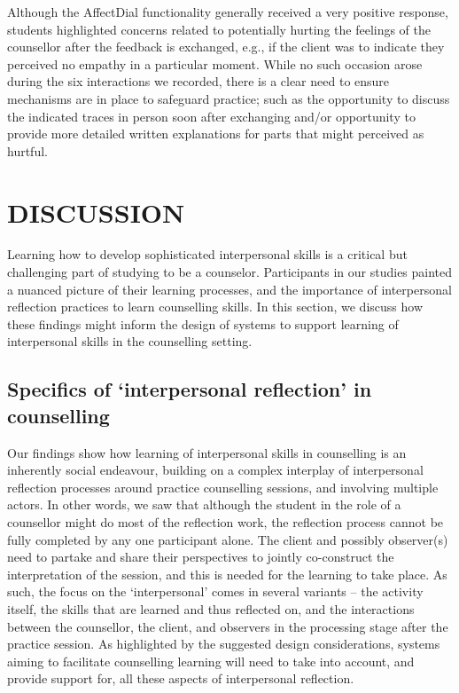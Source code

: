 \documentclass{sigchi}
\begin{document}
Although the AffectDial functionality generally received a very positive response, students highlighted concerns related to potentially hurting the feelings of the counsellor after the feedback is exchanged, e.g., if the client was to indicate they perceived no empathy in a particular moment. While no such occasion arose during the six interactions we recorded, there is a clear need to ensure mechanisms are in place to safeguard practice; such as the opportunity to discuss the indicated traces in person soon after exchanging and/or opportunity to provide more detailed written explanations for parts that might perceived as hurtful. 



\section{DISCUSSION}
Learning how to develop sophisticated interpersonal skills is a critical but challenging part of studying to be a counselor. Participants in our studies painted a nuanced picture of their learning processes, and the importance of interpersonal reflection practices to learn counselling skills. In this section, we discuss how these findings might inform the design of systems to support learning of interpersonal skills in the counselling setting. 


\subsection{Specifics of `interpersonal reflection' in counselling}
Our findings show how learning of interpersonal skills in counselling is an inherently social endeavour, building on a complex interplay of interpersonal reflection processes around practice counselling sessions, and involving multiple actors. In other words, we saw that although the student in the role of a counsellor might do most of the reflection work, the reflection process cannot be fully completed by any one participant alone. The client and possibly observer(s) need to partake and share their perspectives to jointly co-construct the interpretation of the session, and this is needed for the learning to take place. As such, the focus on the `interpersonal' comes in several variants -- the activity itself, the skills that are learned and thus reflected on, and the interactions between the counsellor, the client, and observers in the processing stage after the practice session. As highlighted by the suggested design considerations, systems aiming to facilitate counselling learning will need to take into account, and provide support for, all these aspects of interpersonal reflection.
\end{document}
